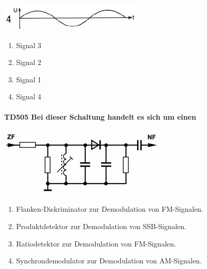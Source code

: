 \documentclass[8pt]{article}
\begin{document}
\begin{enumerate}
\begin{enumerate}[nolistsep,label=\Alph*]
\begin{center}
	\begin{minipage}{\linewidth}
		\centering
		\includegraphics[scale=1.0]{pics/td504_e.jpg}
	\end{minipage}
\end{center}
\begin{enumerate}[nolistsep,label=\Alph*]
\item Signal 3
\item Signal 2
\item Signal 1
\item Signal 4
\end{enumerate}

\paragraph*{TD505 Bei dieser Schaltung handelt es sich um einen}
\begin{center}
	\begin{minipage}{\linewidth}
		\centering
		\includegraphics[scale=1.0]{pics/td505_a.jpg}
	\end{minipage}
\end{center}
\begin{enumerate}[nolistsep,label=\Alph*]
\item Flanken-Diskriminator zur Demodulation von FM-Signalen.
\item Produktdetektor zur Demodulation von SSB-Signalen.
\item Ratiodetektor zur Demodulation von FM-Signalen.
\item Synchrondemodulator zur Demodulation von AM-Signalen.
\end{enumerate}


\end{enumerate}
\end{enumerate}
\end{document}
